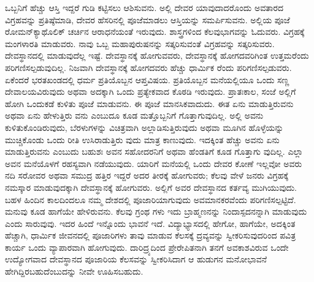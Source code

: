 ಒಬ್ಬನಿಗೆ ಹೆಚ್ಚು ಆಸ್ತಿ ಇದ್ದರೆ ಗುಡಿ ಕಟ್ಟಿಸಲು ಆಶಿಸುವನು. ಅಲ್ಲಿ ದೇವರ ಯಾವುದಾದರೊಂದು ಅವತಾರದ ವಿಗ್ರಹವನ್ನು ಪ್ರತಿಷ್ಠೆಮಾಡಿ, ದೇವರ ಹೆಸರಿನಲ್ಲಿ ಪೂಜೆಮಾಡಲು ಆಸ್ತಿಯನ್ನು ಸಮರ್ಪಿಸುವನು. ಅಲ್ಲಿಯ ಪೂಜೆ ರೋಮನ್​ಕ್ಯಾಥೊಲಿಕ್​ ಚರ್ಚಿನ ಆರಾಧನೆಯಂತೆ ಇರುವುದು. ಶಾಸ್ತ್ರಗಳಿಂದ ಕೆಲವುಭಾಗವನ್ನು ಓದುವರು. ವಿಗ್ರಹಕ್ಕೆ ಮಂಗಳಾರತಿ ಮಾಡುವರು. ನಾವು ಒಬ್ಬ ಮಹಾಪುರುಷನನ್ನು ಸತ್ಕರಿಸುವಂತೆ ವಿಗ್ರಹವನ್ನು ಸತ್ಕರಿಸುವರು. ದೇವಸ್ಥಾನದಲ್ಲಿ ಮಾಡುವುದೆಲ್ಲ ಇಷ್ಟೆ. ದೇವಸ್ಥಾನಕ್ಕೆ ಹೋಗುವವರು, ದೇವಸ್ಥಾನಕ್ಕೆ ಹೋಗದವರಿಗಿಂತ ಉತ್ತಮರೆಂದು ಪರಿಗಣಿಸಲ್ಪಡುವುದಿಲ್ಲ. ನಿಜವಾಗಿ ದೇವಸ್ಥಾನಕ್ಕೆ ಹೋಗದವರು ಹೆಚ್ಚು ಧಾರ್ಮಿಕ ರೆಂದು ಪರಿಗಣಿಸಲ್ಪಡುವರು. ಏಕೆಂದರೆ ಭರತಖಂಡದಲ್ಲಿ ಧರ್ಮ ಪ್ರತಿಯೊಬ್ಬನ ಆಪ್ತವಿಷಯ. ಪ್ರತಿಯೊಬ್ಬನ ಮನೆಯಲ್ಲಿಯೂ ಒಂದು ಸಣ್ಣ ದೇವಾಲಯವಿರುವುದು ಅಥವಾ ಅದಕ್ಕಾಗಿ ಒಂದು ಪ್ರತ್ಯೇಕವಾದ ಕೊಠಡಿ ಇರುವುದು. ಪ್ರಾತಃಕಾಲ, ಸಂಜೆ ಅಲ್ಲಿಗೆ ಹೋಗಿ ಒಂದುಕಡೆ ಕುಳಿತು ಪೂಜೆ ಮಾಡುವನು. ಈ ಪೂಜೆ ಮಾನಸಿಕವಾದುದು. ಈತ ಏನು ಮಾಡುತ್ತಿರುವನು ಅಥವಾ ಏನು ಹೇಳುತ್ತಿರು ವನು ಎಂಬುದೂ ಕೂಡ ಮತ್ತೊಬ್ಬನಿಗೆ ಗೊತ್ತಾಗುವುದಿಲ್ಲ. ಅಲ್ಲಿ ಅವನು ಕುಳಿತುಕೊಂಡಿರುವುದು, ಬೆರಳುಗಳನ್ನು ವಿಚಿತ್ರವಾಗಿ ಅಲ್ಲಾಡಿಸುತ್ತಿರುವುದು ಅಥವಾ ಮೂಗಿನ ಹೊಳ್ಳೆಯನ್ನು ಮುಚ್ಚಿಕೊಂಡು ಒಂದು ರೀತಿ ಉಸಿರಾಡುತ್ತಿರು ವುದು ಮಾತ್ರ ಕಾಣುವುದು. ಇದಕ್ಕಿಂತ ಹೆಚ್ಚು ಅವನು ಏನು ಮಾಡುತ್ತಿರುವನು ಎಂಬುದು ಬಹುಶಃ ಅವನ ಸಹೋದರನಿಗೆ ಅಥವಾ ಹೆಂಡತಿಗೆ ಕೂಡ ಗೊತ್ತಾಗು ವುದಿಲ್ಲ. ಎಲ್ಲಾ ಅವನ ಮನೆಯೊಳಗೆ ರಹಸ್ಯವಾಗಿ ನಡೆಯುವುದು. ಯಾರಿಗೆ ಮನೆಯಲ್ಲಿ ಒಂದು ದೇವರ ಕೋಣೆ ಇಲ್ಲವೋ ಅವರು ನದಿ ಸರೋವರ ಅಥವಾ ಸಮುದ್ರ ಹತ್ತಿರ ಇದ್ದರೆ ಅದರ ತೀರಕ್ಕೆ ಹೋಗುವರು; ಕೆಲವು ವೇಳೆ ಜನರು ವಿಗ್ರಹಕ್ಕೆ ನಮಸ್ಕಾರ ಮಾಡುವುದಕ್ಕಾಗಿ ದೇವಸ್ಥಾನಕ್ಕೆ ಹೋಗುವರು. ಅಲ್ಲಿಗೆ ಅವರ ದೇವಸ್ಥಾನದ ಕರ್ತವ್ಯ ಮುಗಿಯುವುದು. ಬಹಳ ಹಿಂದಿನ ಕಾಲದಿಂದಲೂ ನಮ್ಮ ದೇಶದಲ್ಲಿ ಪೂಜಾರಿಯಾಗುವುದು ಅವಮಾನಕರವೆಂದು ಪರಿಗಣಿಸಲ್ಪಟ್ಟಿದೆ. ಮನುವು ಕೂಡ ಹಾಗೆಯೇ ಹೇಳಿರುವನು. ಕೆಲವು ಗ್ರಂಥ ಗಳು ಇದು ಬ್ರಾಹ್ಮಣನನ್ನು ನಿಂದಾಸ್ಪದನನ್ನಾಗಿ ಮಾಡುವುದು ಎಂದು ಸಾರುವುವು. ಇದರ ಹಿಂದೆ ಇನ್ನೊಂದು ಭಾವನೆ ಇದೆ. ವಿದ್ಯಾಭ್ಯಾಸದಲ್ಲಿ ಹೇಗೋ, ಹಾಗೆಯೇ, ಅದಕ್ಕಿಂತ ಹೆಚ್ಚಾಗಿ, ಧಾರ್ಮಿಕ ಜೀವನದಲ್ಲಿ ಪೂಜಾರಿಗಳು ತಾವು ಮಾಡುವ ಕೆಲಸಕ್ಕೆ ದ್ರವ್ಯವನ್ನು ಸ್ವೀಕರಿಸುವುದರಿಂದ ಪವಿತ್ರ ಕಾರ್ಯ ಒಂದು ವ್ಯಾಪಾರವಾಗಿ ಹೋಗುವುದು. ದಾರಿದ್ರ್ಯದಿಂದ ಪ್ರೇರೇಪಿತನಾಗಿ ತನಗೆ ಅವಕಾಶವಿರುವ ಒಂದೇ ಉದ್ಯೋಗವಾದ ದೇವಸ್ಥಾನದ ಪೂಜಾರಿಯ ಕೆಲಸವನ್ನು ಸ್ವೀಕರಿಸಿದಾಗ ಆ ಹುಡುಗನ ಮನೋಭಾವನೆ ಹೇಗಿದ್ದಿರಬಹುದೆಂಬುದನ್ನು ನೀವೇ ಊಹಿಸಬಹುದು.


